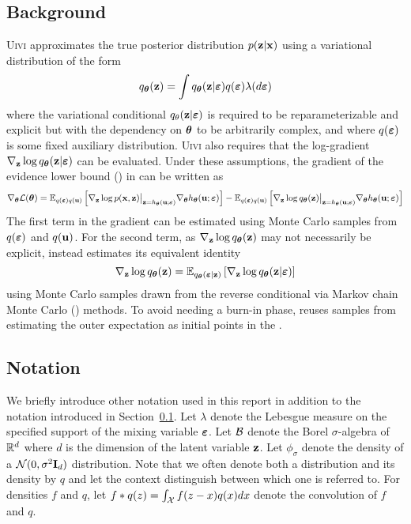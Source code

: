\documentclass[10pt]{article}
\begin{document}
\subsection{Background} \label{sec:background}

\textsc{Uivi} approximates the true posterior distribution $p(\mathbf{z}|\mathbf{x})$ using a variational distribution of the form
\[
q_{\bm{\theta}}(\mathbf{z}) = \int q_{\bm{\theta}}(\mathbf{z}|\bm{\varepsilon})q(\bm{\varepsilon})\lambda(d\bm{\varepsilon})
\]
where the variational conditional $q_\theta(\mathbf{z}|\bm{\varepsilon})$ is required to be reparameterizable and explicit but with the dependency on ${\bm{\theta}}$ to be arbitrarily complex, and where $q(\bm{\varepsilon})$ is some fixed auxiliary distribution. \textsc{Uivi} also requires that the log-gradient $\nabla_{\mathbf{z}}\log q_{\bm{\theta}}(\mathbf{z}|\bm{\varepsilon})$ can be evaluated. Under these assumptions, the gradient of the evidence lower bound (\elbo) in \uivi can be written as
\[
\nabla_{\bm{\theta}} \mathcal{L}({\bm{\theta}}) = \mathbb{E}_{q(\bm{\varepsilon})q(\mathbf{u})}\left[\nabla_{\mathbf{z}} \log p(\mathbf{x},\mathbf{z})\big|_{\mathbf{z}=h_{\bm{\theta}}(\mathbf{u};\bm{\varepsilon})}\nabla_{\bm{\theta}} h_{\bm{\theta}}(\mathbf{u};\bm{\varepsilon})\right] - \mathbb{E}_{q(\bm{\varepsilon})q(\mathbf{u})}\left[\nabla_{\mathbf{z}} \log q_{\bm{\theta}}(\mathbf{z})\big|_{\mathbf{z}=h_{\bm{\theta}}(\mathbf{u};\bm{\varepsilon})}\nabla_{\bm{\theta}} h_{\bm{\theta}}(\mathbf{u};\bm{\varepsilon})\right]
\]
The first term in the gradient can be estimated using Monte Carlo samples from $q(\bm{\varepsilon})$ and $q(\mathbf{u})$. For the second term, as $\nabla_{\mathbf{z}} \log q_{\bm{\theta}}(\mathbf{z})$ may not necessarily be explicit, \uivi instead estimates its equivalent identity
\[
\nabla_{\mathbf{z}} \log q_{\bm{\theta}}(\mathbf{z}) = \mathbb{E}_{q_{\bm{\theta}}(\bm{\varepsilon}|\mathbf{z})}\left[\nabla_{\mathbf{z}}\log q_{\bm{\theta}}(\mathbf{z}|\bm{\varepsilon})\right]
\]
using Monte Carlo samples drawn from the reverse conditional via Markov chain Monte Carlo (\mcmc) methods. To avoid needing a burn-in phase, \uivi reuses samples from estimating the outer expectation as initial points in the \mcmc.


\subsection{Notation} \label{sec:notation}

We briefly introduce other notation used in this report in addition to the notation introduced in Section~\ref{sec:background}. Let $\lambda$ denote the Lebesgue measure on the specified support of the mixing variable $\bm{\varepsilon}$. Let $\mathcal{B}$ denote the Borel $\sigma$-algebra of $\mathbb{R}^d$ where $d$ is the dimension of the latent variable $\mathbf{z}$. Let $\phi_\sigma$ denote the density of a $\mathcal{N}(0,\sigma^2\mathbf{I}_d)$ distribution. Note that we often denote both a distribution and its density by $q$ and let the context distinguish between which one is referred to. For densities $f$ and $q$, let $f*q(z)=\int_{\mathcal{X}} f(z-x)q(x)dx$ denote the convolution of $f$ and $q$.
\end{document}
